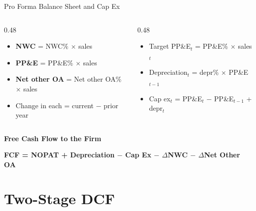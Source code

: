 \documentclass[aspectratio=169]{beamer}
\begin{document}
\begin{frame}{Pro Forma Balance Sheet and Cap Ex}
\begin{columns}[T]
\begin{column}{0.48\textwidth}
\begin{shadedbox}[title=\textbf{Balance Sheet Items}]
\begin{itemize}\small
  \item \textbf{NWC} = NWC\% $\times$ sales
  \item \textbf{PP\&E} = PP\&E\% $\times$ sales
  \item \textbf{Net other OA} = Net other OA\% $\times$ sales
  \item Change in each = current $-$ prior year
\end{itemize}
\end{shadedbox}
\end{column}
\begin{column}{0.48\textwidth}
\begin{shadedbox}[title=\textbf{Capital Expenditures}]
\begin{itemize}\small
  \item Target PP\&E$_t$ = PP\&E\% $\times$ sales$_t$
  \item Depreciation$_t$ = depr\% $\times$ PP\&E$_{t-1}$
  \item \alert{Cap ex$_t$ = PP\&E$_t$ $-$ PP\&E$_{t-1}$ + depr$_t$}
\end{itemize}
\end{shadedbox}
\end{column}
\end{columns}
\vspace{0.3cm}
\textbf{Free Cash Flow to the Firm}
\begin{center}
\textbf{FCF = NOPAT + Depreciation $-$ Cap Ex $-$ $\Delta$NWC $-$ $\Delta$Net Other OA}
\end{center}
\end{frame}

\section{Two-Stage DCF}
\end{document}
